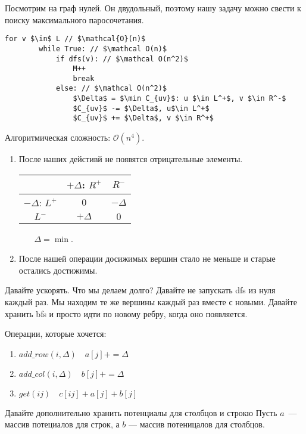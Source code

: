 Посмотрим на граф нулей. Он двудольный, поэтому нашу задачу можно свести к поиску максимального паросочетания.


\begin{lstlisting}[mathescape=true]
    for v $\in$ L // $\mathcal{O}(n)$
        while True: // $\mathcal O(n)$
            if dfs(v): // $\mathcal O(n^2)$
                M++
                break
            else: // $\mathcal O(n^2)$
                $\Delta$ = $\min C_{uv}$: u $\in L^+$, v $\in R^-$
                $C_{uv}$ -= $\Delta$, u$\in L^+$
                $C_{uv}$ += $\Delta$, v $\in R^+$
\end{lstlisting}

Алгоритмическая сложность: $\mathcal O(n^4)$.

\begin{theorem}
\begin{enumerate}
    \item После наших дейстивй не появятся отрицательные элементы.

    \begin{tabular}{c|c|c|}
        & $+\Delta$: $R^{+}$ & $R^-$ \\ \hline
        $-\Delta$: $L^+$ & $0$ & $-\Delta$\\ \hline
        $L^-$ & $+\Delta$ & $0$\\ \hline
    \end{tabular}~~~ $\Delta = \min$.

    \item После нашей операции досижимых вершин стало не меньше и старые остались достижимы.
\end{enumerate}
\end{theorem}

Давайте ускорять. Что мы делаем долго? Давайте не запускать dfs из нуля каждый раз. Мы находим те же вершины каждый раз вместе с новыми.
Давайте хранить bfs и просто идти по новому ребру, когда оно появляется.

Операции, которые хочется:
\begin{enumerate}
    \item $add\_row(i, \Delta)\quad a[j] +=\Delta$
    \item $add\_col(i, \Delta)\quad b[j] +=\Delta$
    \item $get(ij)\quad c[ij] + a[j] + b[j]$
\end{enumerate}

Давайте дополнительно хранить потенциалы для столбцов и строкю Пусть $a$~--- массив потециалов для строк, а $b$ --- массив потеницалов для столбцов.


